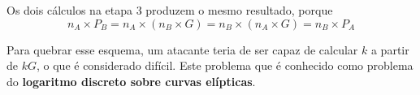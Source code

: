 Os dois cálculos na etapa 3 produzem o mesmo resultado, porque
\begin{equation*}
n_A \times P_B = n_A \times (n_B \times G) = n_B \times (n_A \times G) = n_B \times P_A
\end{equation*}

Para quebrar esse esquema, um atacante teria de ser capaz de calcular \(k\) a partir de \(kG\), o que é considerado difícil. Este problema que é conhecido como problema do \textbf{logaritmo discreto sobre curvas elípticas}.
